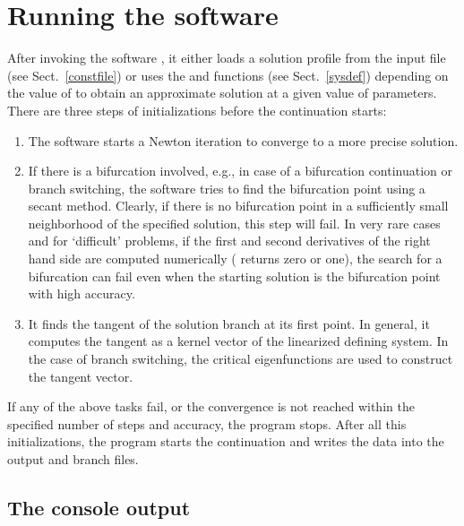 \documentclass[10pt,a4paper]{ddedoc}
\begin{document}
\section{Running the software}

After invoking the software , it either loads a solution profile from the input file (see Sect.\ \ref{constfile}) or uses the 
 and  functions (see Sect.\ \ref{sysdef}) depending on the value of  to obtain an approximate solution at a given value of parameters. There are three steps of initializations before the continuation starts:
\begin{enumerate}
\item The software starts a Newton iteration to converge to a more precise solution.
\item If there is a bifurcation involved, e.g., in case of a bifurcation continuation or branch switching, the software tries to find the bifurcation point using a secant method. Clearly, if there is no bifurcation point in a sufficiently small neighborhood of the specified solution, this step will fail. In very rare cases and for `difficult' problems, if the first and second derivatives of the right hand side are computed numerically ( returns zero or one), the search for a bifurcation can fail even when the starting solution is the bifurcation point with high accuracy.
\item It finds the tangent of the solution branch at its first point. In general, it computes the tangent as a kernel vector of the linearized defining system. In the case of branch switching, the critical eigenfunctions are used to construct the tangent vector.
\end{enumerate}
If any of the above tasks fail, or the convergence is not reached within the specified number of steps and accuracy, the program stops.
After all this initializations, the program starts the continuation and writes the data into the output and branch files.

\subsection{The console output}
\end{document}
